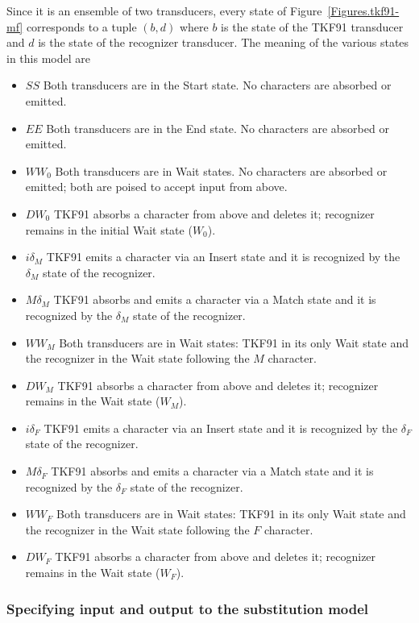 \documentclass{article}
\newcommand{\figref}[1]{Figure~\ref{Figures.#1}}
\begin{document}
Since it is an ensemble of two transducers, every state of \figref{tkf91-mf} corresponds to a tuple $(b,d)$
where
$b$ is the state of the TKF91 transducer and
$d$ is the state of the recognizer transducer.
The meaning of the various states in this model are
\begin{itemize}
\item $SS$ Both transducers are in the Start state.  No characters are  absorbed or emitted.
\item $EE$ Both transducers are in the End state.  No characters are  absorbed or emitted.
\item $WW_0$ Both transducers are in Wait states.  No characters are absorbed or emitted; both are poised to accept input from above. 
\item $DW_0$ TKF91 absorbs a character from above and deletes it; recognizer remains in the initial Wait state ($W_0$).  
\item $i\delta_M$ TKF91 emits a character via an Insert state and it is recognized by the $\delta_M$ state of the recognizer.  
\item $M\delta_M$ TKF91 absorbs and emits a character via a Match state and it is recognized by the $\delta_M$ state of the recognizer.  
\item $WW_M$ Both transducers are in Wait states: TKF91 in its only Wait state and the recognizer in the Wait state following the $M$ character. 
\item $DW_M$ TKF91 absorbs a character from above and deletes it; recognizer remains in the Wait state ($W_M$).  
\item $i\delta_F$ TKF91 emits a character via an Insert state and it is recognized by the $\delta_F$ state of the recognizer.  
\item $M\delta_F$ TKF91 absorbs and emits a character via a Match state and it is recognized by the $\delta_F$ state of the recognizer.  
\item $WW_F$ Both transducers are in Wait states: TKF91 in its only Wait state and the recognizer in the Wait state following the $F$ character. 
\item $DW_F$ TKF91 absorbs a character from above and deletes it; recognizer remains in the Wait state ($W_F$).  
\end{itemize}



\subsubsection{Specifying input and output to the substitution model}
\end{document}
